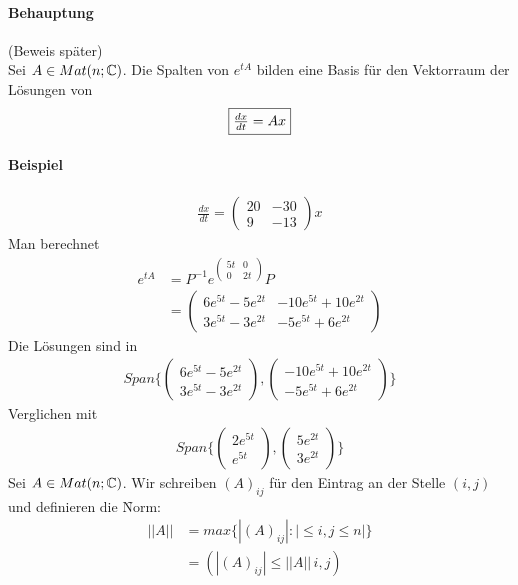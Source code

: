 \paragraph{Behauptung} (Beweis später) \\
Sei $A \in Mat(n; \mathbb{C})$. Die Spalten von $e^{tA}$ bilden eine Basis für den Vektorraum der Lösungen von
\begin{align}
\fbox{$
\frac{dx}{dt} = Ax
$}
\end{align}

\paragraph{Beispiel}
\begin{align}
\frac{dx}{dt} = \begin{pmatrix} 20 & -30 \\ 9 & -13\end{pmatrix}x
\end{align}
Man berechnet
\begin{align}
e^{tA} &= P^{-1} e^{\begin{pmatrix} 5t & 0 \\ 0 & 2t \end{pmatrix}} P \\
&= \begin{pmatrix} 6e^{5t} - 5e^{2t} & -10e^{5t} + 10e^{2t} \\ 3e^{5t} - 3e^{2t} & -5e^{5t} + 6e^{2t} \end{pmatrix}
\end{align}
Die Lösungen sind in 
\begin{align}
Span\{\begin{pmatrix} 6e^{5t} - 5e^{2t} \\ 3e^{5t} - 3e^{2t} \end{pmatrix}, \begin{pmatrix} -10e^{5t} + 10e^{2t} \\ -5e^{5t} + 6e^{2t} \end{pmatrix}\}
\end{align}
Verglichen mit
\begin{align}
Span\{\begin{pmatrix} 2e^{5t} \\ e^{5t}\end{pmatrix}, \begin{pmatrix} 5e^{2t} \\ 3e^{2t}\end{pmatrix}\}
\end{align}
Sei $A \in Mat(n; \mathbb{C})$. Wir schreiben $(A)_{ij}$ für den Eintrag an der Stelle $(i, j)$ und definieren die \f{Norm}: 
\begin{align}
||A|| &= max\{ |(A)_{ij}| : |\leq i, j \leq n|\} \\
&= (|(A)_{ij}| \leq ||A||\, i, j)
\end{align}

